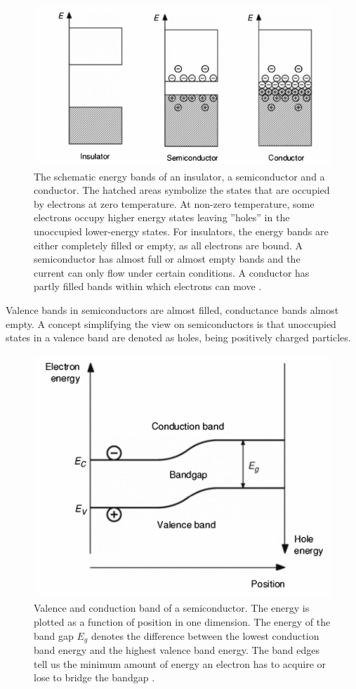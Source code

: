 \documentclass[main]{subfiles}
\begin{document}
\begin{figure}[H]
\centering
\includegraphics[scale=0.5]{figs/energybands.png}
\caption{The schematic energy bands of an insulator, a semiconductor and a conductor. The hatched areas symbolize the states that are occupied by electrons at zero temperature. At non-zero temperature, some electrons occupy higher energy states leaving ''holes'' in the unoccupied lower-energy states. For insulators, the energy bands are either completely filled or empty, as all electrons are bound. A semiconductor has almost full or almost empty bands and the current can only flow under certain conditions. A conductor has partly filled bands within which electrons can move \cite{book:VLSI}.}
\end{figure}

Valence bands in semiconductors are almost filled, conductance bands almost empty. A concept simplifying the view on semiconductors is that unoccupied states in a valence band are denoted as holes, being positively charged particles.

\begin{figure}[H]
\centering
\includegraphics[scale=0.5]{figs/bandgap.png}
\caption{Valence and conduction band of a semiconductor. The energy is plotted as a function of position in one dimension. The energy of the band gap \(E_g\) denotes the difference between the lowest conduction band energy and the highest valence band energy. The band edges tell us the minimum amount of energy an electron has to acquire or lose to bridge the bandgap \cite{book:VLSI}.}
\end{figure}
\end{document}

